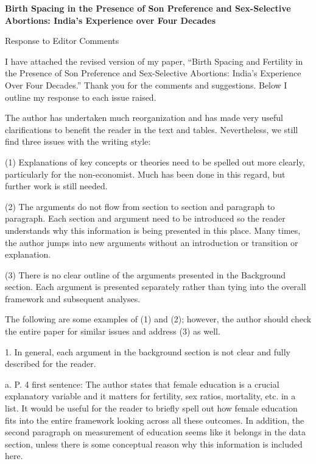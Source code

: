 \documentclass[letterpaper,12pt]{article}
\title{} \author{}
\begin{document}
\begin{center} \textbf{\large Birth Spacing in the Presence of Son
Preference and 
Sex-Selective Abortions: India's Experience over Four Decades}
\end{center}

\begin{center} Response to Editor Comments \end{center}

\noindent I have attached the revised version of my paper,
``Birth Spacing and Fertility in the Presence of Son Preference and Sex-Selective
Abortions: India's Experience Over Four Decades.''
Thank you for the comments and suggestions. 
Below I outline my response to each issue raised.


The author has undertaken much reorganization and has made very useful clarifications to
benefit the reader in the text and tables. Nevertheless, we still find three issues with
the writing style:

(1) Explanations of key concepts or theories need to be spelled out more clearly,
particularly for the non-economist. Much has been done in this regard, but further work is
still needed.

(2) The arguments do not flow from section to section and paragraph to paragraph. Each
section and argument need to be introduced so the reader understands why this information
is being presented in this place. Many times, the author jumps into new arguments without
an introduction or transition or explanation.

(3) There is no clear outline of the arguments presented in the Background section. Each
argument is presented separately rather than tying into the overall framework and
subsequent analyses.

The following are some examples of (1) and (2); however, the author should check the entire
paper for similar issues and address (3) as well.

1. In general, each argument in the background section is not clear and fully described for
the reader.

a. P. 4 first sentence: The author states that female education is a crucial explanatory
variable and it matters for fertility, sex ratios, mortality, etc. in a list. It would be
useful for the reader to briefly spell out how female education fits into the entire
framework looking across all these outcomes. In addition, the second paragraph on
measurement of education seems like it belongs in the data section, unless there is some
conceptual reason why this information is included here.
\end{document}
